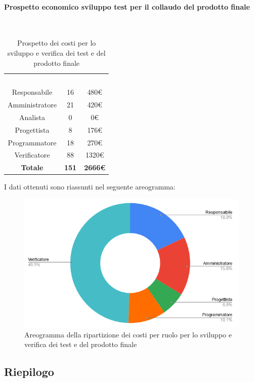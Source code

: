 \paragraph{Prospetto economico sviluppo test per il collaudo del prodotto finale}\mbox{} \\
\begin{table}[H]
\centering\renewcommand{\arraystretch}{1.5}
\caption{Prospetto dei costi per lo sviluppo e verifica dei test e del prodotto finale}
\vspace{0.2cm}
\begin{tabular}{ c c c }
\rowcolor{redafk}
\textcolor{white}{\textbf{Ruolo}} & \textcolor{white}{\textbf{Ore}} &
\textcolor{white}{\textbf{Costo}}  \\
Responsabile & 16 & 480€ \\
Amministratore & 21 & 420€ \\
Analista & 0 & 0€ \\
Progettista & 8 & 176€ \\
Programmatore & 18 & 270€  \\
Verificatore & 88 & 1320€  \\
\rowcolor{lastrowcolor}
\textbf{Totale} & \textbf{151} & \textbf{2666€}  \\
\end{tabular}
\end{table}
 
I dati ottenuti sono riassunti nel seguente areogramma:
\begin{figure}[H]
\centering
\includegraphics[scale=0.60]{img/grafici/torta_test.png}
\caption{Areogramma della ripartizione dei costi per ruolo per lo sviluppo e verifica dei test e del prodotto finale}
\end{figure}

\subsection{Riepilogo}
